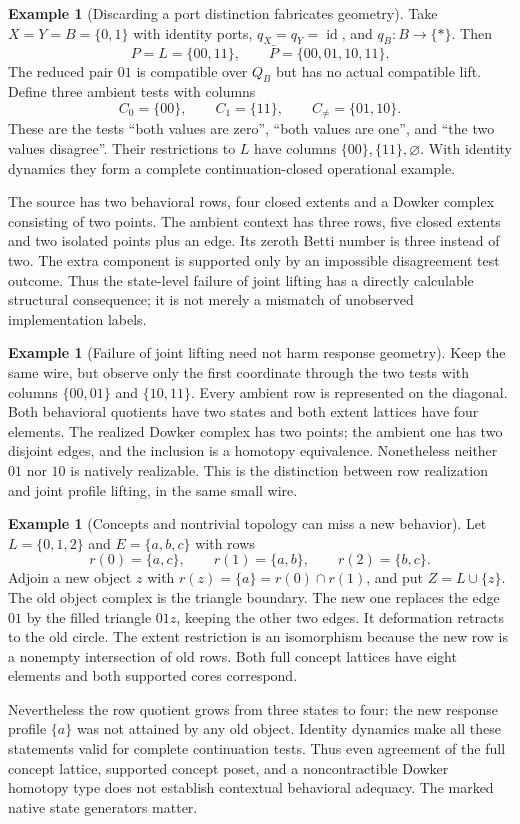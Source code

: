 \documentclass[11pt]{article}
\theoremstyle{definition}
\newtheorem{example}[theorem]{Example}
\theoremstyle{remark}\newtheorem{remark}[theorem]{Remark}
\newcommand{\id}{\operatorname{id}}
\begin{document}
\begin{example}[Discarding a port distinction fabricates geometry]
\label{v:ex:phantom}
Take $X=Y=B=\{0,1\}$ with identity ports, $q_X=q_Y=\id$, and
$q_B:B\to\{*\}$. Then
\[
 P=L=\{00,11\},\qquad \bar P=\{00,01,10,11\}.
\]
The reduced pair $01$ is compatible over $Q_B$ but has no actual compatible
lift. Define three ambient tests with columns
\[
 C_0=\{00\},\qquad C_1=\{11\},\qquad C_{\ne}=\{01,10\}.
\]
These are the tests ``both values are zero'', ``both values are one'', and
``the two values disagree''. Their restrictions to $L$ have columns
$\{00\},\{11\},\varnothing$. With identity dynamics they form a
complete continuation-closed operational example.

The source has two behavioral rows, four closed extents and a Dowker
complex consisting of two points. The ambient context has three rows,
five closed extents and two isolated points plus an edge. Its zeroth
Betti number is three instead of two. The extra component is supported
only by an impossible disagreement test outcome. Thus the state-level
failure of joint lifting has a directly calculable structural consequence;
it is not merely a mismatch of unobserved implementation labels.
\end{example}

\begin{example}[Failure of joint lifting need not harm response geometry]
Keep the same wire, but observe only the first coordinate through the two
tests with columns $\{00,01\}$ and $\{10,11\}$. Every ambient row is
represented on the diagonal. Both behavioral quotients have two states
and both extent lattices have four elements. The realized Dowker complex
has two points; the ambient one has two disjoint edges, and the inclusion
is a homotopy equivalence. Nonetheless neither $01$ nor $10$ is natively
realizable. This is the distinction between row realization and joint
profile lifting, in the same small wire.
\end{example}

\begin{example}[Concepts and nontrivial topology can miss a new behavior]
\label{v:ex:triangle}
Let $L=\{0,1,2\}$ and $E=\{a,b,c\}$ with rows
\[
 r(0)=\{a,c\},\qquad r(1)=\{a,b\},\qquad r(2)=\{b,c\}.
\]
Adjoin a new object $z$ with $r(z)=\{a\}=r(0)\cap r(1)$, and put
$Z=L\cup\{z\}$. The old object complex is the triangle boundary.
The new one replaces the edge $01$ by the filled triangle $01z$, keeping
the other two edges. It deformation retracts to the old circle.
The extent restriction is an isomorphism because the new row is a
nonempty intersection of old rows. Both full concept lattices have eight
elements and both supported cores correspond.

Nevertheless the row quotient grows from three states to four: the new
response profile $\{a\}$ was not attained by any old object. Identity
dynamics make all these statements valid for complete continuation tests.
Thus even agreement of the full concept lattice, supported concept poset,
and a noncontractible Dowker homotopy type does not establish contextual
behavioral adequacy. The marked native state generators matter.
\end{example}
\end{document}
